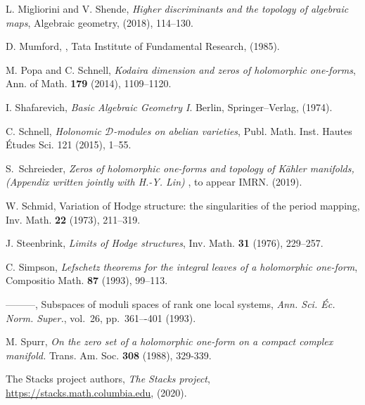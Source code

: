 \documentclass[a4paper,12pt,reqno]{amsart}
\theoremstyle{plain}
\theoremstyle{definition}
\theoremstyle{remark}
\begin{document}
\begin{thebibliography}{HKLR}
 L. Migliorini and V. Shende, \textit{Higher discriminants and the topology of algebraic maps}, Algebraic geometry, (2018), 114--130.

 D. Mumford, , Tata Institute of Fundamental Research, (1985).

 M. Popa and C. Schnell, \textit{Kodaira dimension and zeros of holomorphic one-forms}, Ann. of Math. \textbf{179} (2014), 1109--1120.


 I. Shafarevich, \textit{Basic Algebraic Geometry I}. Berlin, Springer--Verlag, (1974).

C. Schnell, {\it  Holonomic $\mathcal{D}$-modules on abelian varieties},
Publ. Math. Inst. Hautes \'{E}tudes Sci. 121 (2015), 1--55.

 S.\ Schreieder, \textit{Zeros of holomorphic one-forms and topology of K\"ahler manifolds, (Appendix written jointly with H.-Y. Lin) }, to appear IMRN. (2019).

 W. Schmid, Variation of Hodge structure: the singularities of the period mapping, Inv. Math. \textbf{22} (1973), 211--319.

 J. Steenbrink, \textit{Limits of Hodge structures}, Inv. Math. \textbf{31} (1976), 229--257.




 C. Simpson, \textit{Lefschetz theorems for the integral leaves of a holomorphic one-form}, Compositio Math. \textbf{87} (1993), 99--113.

 ---------, Subspaces of moduli spaces of rank one local systems, \textit{Ann. Sci. \'Ec. Norm. Super.}, vol.\ 26,
pp.\ 361–-401 (1993).

 M. Spurr, {\it On the zero set of a holomorphic one-form on a compact complex manifold.} Trans. Am.
Soc. \textbf{308} (1988), 329-339. 

 The {Stacks project authors}, \textit{The Stacks project}, \url{https://stacks.math.columbia.edu}, (2020).


\end{thebibliography}
\end{document}

